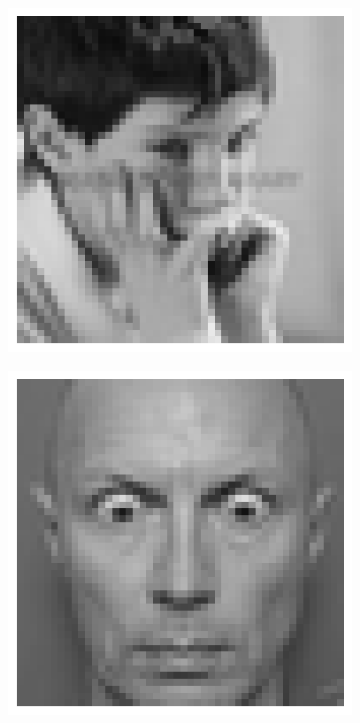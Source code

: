 \documentclass{article}
\begin{document}
\begin{figure}
\begin{subfigure}{0.1\textwidth}
  \end{subfigure}
  \newline
  \centering
  \begin{subfigure}{0.1\textwidth}
    \centering
    \includegraphics[width=\textwidth]{"sad"}
  \end{subfigure}
  \begin{subfigure}{0.1\textwidth}
    \centering
    \includegraphics[width=\textwidth]{"surprise"}

\end{subfigure}
\end{figure}
\end{document}
